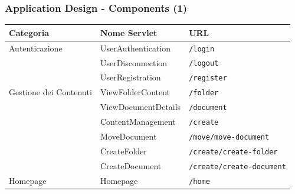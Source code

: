 \documentclass[aspectratio=169]{beamer}
\begin{document}
\begin{frame}
    \frametitle{Application Design - Components (1)}
    \begin{table}[h!]
        \centering
        \begin{tabular}{|l|l|l|}
            \hline
            \textbf{Categoria}     & \textbf{Nome Servlet} & \textbf{URL}                     \\ \hline
            Autenticazione         & UserAuthentication    & \texttt{/login}                  \\ \cline{2-3}
                                   & UserDisconnection     & \texttt{/logout}                 \\ \cline{2-3}
                                   & UserRegistration      & \texttt{/register}               \\
            \hline
            Gestione dei Contenuti & ViewFolderContent     & \texttt{/folder}                 \\ \cline{2-3}
                                   & ViewDocumentDetails   & \texttt{/document}               \\ \cline{2-3}
                                   & ContentManagement     & \texttt{/create}                 \\ \cline{2-3}
                                   & MoveDocument          & \texttt{/move/move-document}     \\ \cline{2-3}
                                   & CreateFolder          & \texttt{/create/create-folder}   \\ \cline{2-3}
                                   & CreateDocument        & \texttt{/create/create-document} \\
            \hline
            Homepage               & Homepage              & \texttt{/home}                   \\ \hline
        \end{tabular}
    \end{table}
\end{frame}
\end{document}
